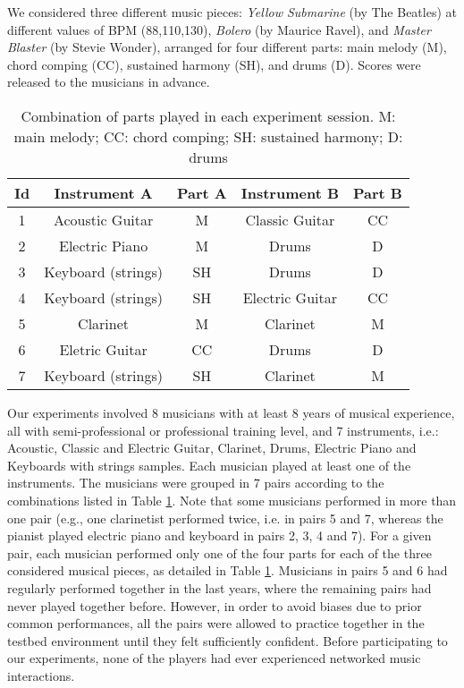 We considered three different music pieces: \textit{Yellow Submarine} (by The Beatles) at different values of BPM (88,110,130), \textit{Bolero} (by Maurice Ravel), and \textit{Master Blaster} (by Stevie Wonder), arranged for four different parts: main melody (M), chord comping (CC), sustained harmony (SH), and drums (D).  Scores were released to the musicians in advance.

\begin{table}[tb]
  \caption{Combination of parts played in each experiment session. M: main melody; CC: chord comping; SH: sustained harmony; D: drums}
  \centering %
  \label{tab:NMP:sessions}
  \bgroup
  \def\arraystretch{1.5}
 \begin{tabular}{||c|c|c|c|c||}
 \hline
 \hline
  Id & Instrument A& Part A & Instrument B & Part B \\
 \hline
 \hline
  1 & Acoustic Guitar & M & Classic Guitar & CC\\
  2 & Electric Piano & M & Drums & D\\
  3 & Keyboard (strings)  & SH & Drums & D\\
  4 & Keyboard (strings)  & SH & Electric Guitar & CC\\
  5 & Clarinet & M & Clarinet & M\\
  6 & Eletric Guitar  & CC & Drums & D\\
  7 & Keyboard (strings)  & SH & Clarinet & M\\
 \hline
 \hline
   \end{tabular}
   \egroup
\end{table}

Our experiments involved 8 musicians with at least 8 years of musical experience, all with semi-professional or professional training level, and 7 instruments, i.e.:
Acoustic, Classic and Electric Guitar, Clarinet, Drums, Electric Piano and Keyboards with strings samples. Each musician played at least one of the instruments. The musicians were grouped in 7 pairs according to the combinations listed in Table \ref{tab:NMP:sessions}. Note that some musicians performed in more than one pair (e.g., one clarinetist performed twice, i.e. in pairs 5 and 7, whereas the pianist played electric piano and keyboard in pairs 2, 3, 4 and 7). For a given pair, each musician performed only one of the four parts for each of the three considered musical pieces, as detailed in Table \ref{tab:NMP:sessions}. Musicians in pairs 5 and 6 had regularly performed together in the last years, where the remaining pairs had never played together before. However, in order to avoid biases due to prior common performances, all the pairs were allowed to practice together in the testbed environment until they felt sufficiently confident. Before participating to our experiments, none of the players had ever experienced networked music interactions.

